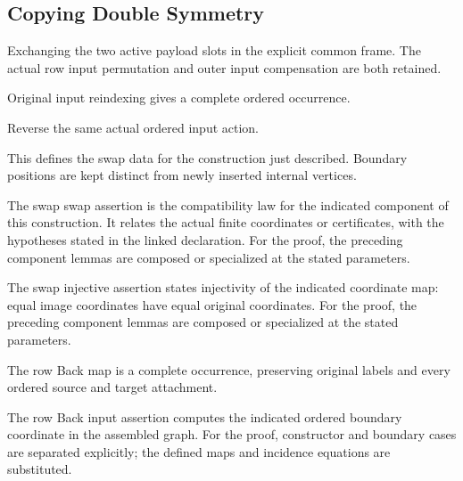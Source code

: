 \subsection{Copying Double Symmetry}
Exchanging the two active payload slots in the explicit common frame. The actual row input permutation and outer input compensation are both retained.

Original input reindexing gives a complete ordered occurrence.
\par{}

Reverse the same actual ordered input action.
\par{}

This defines the swap data for the construction just described. Boundary positions are kept distinct from newly inserted internal vertices.
\par{}

The swap swap assertion is the compatibility law for the indicated component of this construction. It relates the actual finite coordinates or certificates, with the hypotheses stated in the linked declaration.
For the proof, the preceding component lemmas are composed or specialized at the stated parameters.
\par{}

The swap injective assertion states injectivity of the indicated coordinate map: equal image coordinates have equal original coordinates.
For the proof, the preceding component lemmas are composed or specialized at the stated parameters.
\par{}

The row Back map is a complete occurrence, preserving original labels and every ordered source and target attachment.
\par{}

The row Back input assertion computes the indicated ordered boundary coordinate in the assembled graph.
For the proof, constructor and boundary cases are separated explicitly; the defined maps and incidence equations are substituted.
\par{}

